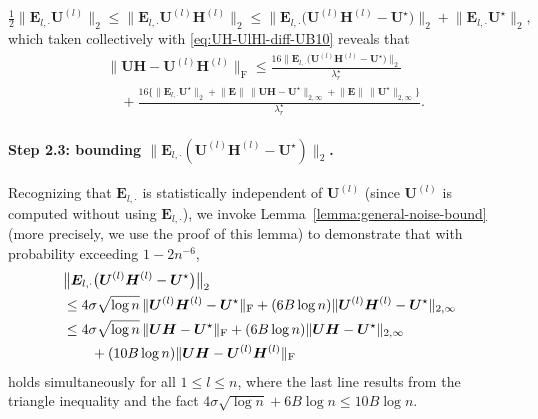 %
\[
	\tfrac{1}{2}\big\|\bm{E}_{l,\cdot}\bm{U}^{(l)}\big\|_{2}\leq \big\|\bm{E}_{l,\cdot}\bm{U}^{(l)}\bm{H}^{(l)}\big\|_{2}
	\leq \big\|\bm{E}_{l,\cdot}\big(\bm{U}^{(l)}\bm{H}^{(l)}-\bm{U}^{\star}\big)\big\|_{2}+ \big\|\bm{E}_{l,\cdot}\bm{U}^{\star}\big\|_{2},
\]
%
which taken collectively with \eqref{eq:UH-UlHl-diff-UB10} reveals that
%
\begin{align}
 & \big\|\bm{U}\bm{H}-\bm{U}^{(l)}\bm{H}^{(l)}\big\|_{\mathrm{F}}
	\leq\frac{16\big\|\bm{E}_{l,\cdot}\big(\bm{U}^{(l)}\bm{H}^{(l)}-\bm{U}^{\star}\big)\big\|_{2}}{\lambda_{r}^{\star}} \nonumber \\
	&  \quad + \frac{ 16 \Big\{ \big\|\bm{E}_{l,\cdot}\bm{U}^{\star}\big\|_{2}  + \big\|\bm{E}\big\| \, \big\|\bm{U}\bm{H}-\bm{U}^{\star}\big\|_{2,\infty} +  \big\|\bm{E}\big\|\, \big\|\bm{U}^{\star}\big\|_{2,\infty} \Big\} }{\lambda_{r}^{\star}}.
	\label{eq:UH-UlHl-diff-UB123}
\end{align}
%










\paragraph{Step 2.3: bounding $\|\bm{E}_{l,\cdot} (\bm{U}^{(l)}\bm{H}^{(l)}-\bm{U}^{\star} ) \|_{2}$.}

%
Recognizing that $\bm{E}_{l,\cdot}$ is statistically independent of $\bm{U}^{(l)}$ (since $\bm{U}^{(l)}$ is computed without using $\bm{E}_{l,\cdot}$),
we invoke Lemma~\ref{lemma:general-noise-bound} (more precisely, we use the proof of this lemma) to demonstrate that
with probability exceeding $1-2n^{-6}$,
%
\begin{align}
 & \big\|\bm{E}_{l,\cdot}\big(\bm{U}^{(l)}\bm{H}^{(l)}-\bm{U}^{\star}\big)\big\|_{2} \notag\\
 & \leq4\sigma\sqrt{\log n} \, \|\bm{U}^{(l)}\bm{H}^{(l)}-\bm{U}^{\star}\|_{\mathrm{F}}
	+ (6B \log n) \|\bm{U}^{(l)}\bm{H}^{(l)}-\bm{U}^{\star}\|_{2,\infty} \nonumber \\
	& \leq4\sigma \sqrt{\log n} \, \|\bm{U}\bm{H}-\bm{U}^{\star}\|_{\mathrm{F}} + (6B \log n) \|\bm{U}\bm{H}-\bm{U}^{\star}\|_{2,\infty} \nonumber \\
	& \qquad+ ( 10B\log n) \|\bm{U}\bm{H}-\bm{U}^{(l)}\bm{H}^{(l)}\|_{\mathrm{F}}
 \label{eq:El-UH-Ustar-UB-Bern1}
\end{align}
%
holds simultaneously for all $1\leq l\leq n$, where the last line results from the triangle inequality and the fact $4\sigma\sqrt{\log n}+6B\log n\leq 10B\log n$.


